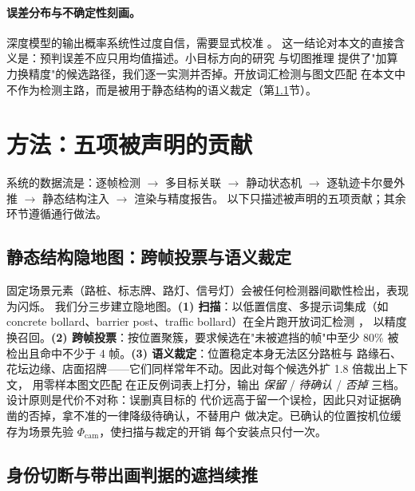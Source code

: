\documentclass[11pt,a4paper]{ctexart}
\begin{document}
\paragraph{误差分布与不确定性刻画。}
深度模型的输出概率系统性过度自信，需要显式校准 \citep{guo2017calibration}。
这一结论对本文的直接含义是：预判误差不应只用均值描述。小目标方向的研究
\citep{cheng2022smallobj,khalili2024sodyolov8} 与切图推理 \citep{akyon2022sahi,keles2022sliced}
提供了"加算力换精度"的候选路径，我们逐一实测并否掉。开放词汇检测与图文匹配
\citep{cheng2024yoloworld,radford2021clip,minderer2022owlvit,gu2021vild}
在本文中不作为检测主路，而是被用于静态结构的语义裁定（第\ref{sec:c1}节）。

\section{方法：五项被声明的贡献}
\label{sec:method}

系统的数据流是：逐帧检测 $\rightarrow$ 多目标关联 $\rightarrow$ 静动状态机
$\rightarrow$ 逐轨迹卡尔曼外推 $\rightarrow$ 静态结构注入 $\rightarrow$ 渲染与精度报告。
以下只描述被声明的五项贡献；其余环节遵循通行做法。

\subsection{静态结构隐地图：跨帧投票与语义裁定}
\label{sec:c1}

固定场景元素（路桩、标志牌、路灯、信号灯）会被任何检测器间歇性检出，表现为闪烁。
我们分三步建立隐地图。\textbf{(1) 扫描}：以低置信度、多提示词集成（如 concrete
bollard、barrier post、traffic bollard）在全片跑开放词汇检测 \citep{cheng2024yoloworld}，
以精度换召回。\textbf{(2) 跨帧投票}：按位置聚簇，要求候选在"未被遮挡的帧"中至少
80\% 被检出且命中不少于 4 帧。\textbf{(3) 语义裁定}：位置稳定本身无法区分路桩与
路缘石、花坛边缘、店面招牌——它们同样常年不动。因此对每个候选外扩 1.8 倍裁出上下文，
用零样本图文匹配 \citep{radford2021clip} 在正反例词表上打分，输出
\emph{保留} / \emph{待确认} / \emph{否掉} 三档。设计原则是代价不对称：误删真目标的
代价远高于留一个误检，因此只对证据确凿的否掉，拿不准的一律降级待确认，不替用户
做决定。已确认的位置按机位缓存为场景先验 $\Phi_{\text{cam}}$，使扫描与裁定的开销
每个安装点只付一次。

\subsection{身份切断与带出画判据的遮挡续推}
\label{sec:c2}
\end{document}
